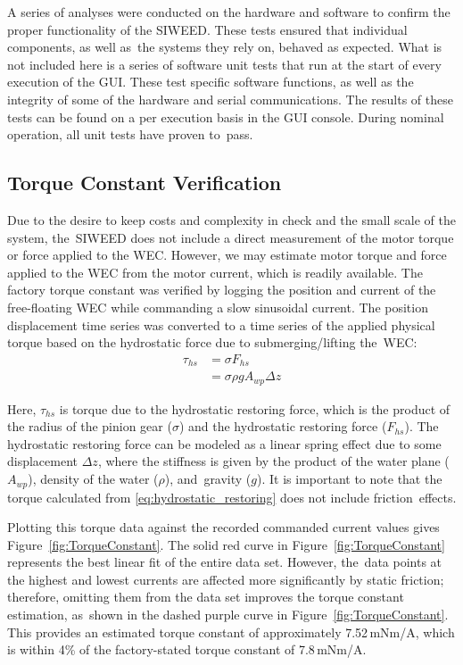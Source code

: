 \documentclass[hardware,article,submit,pdftex,moreauthors]{Definitions/mdpi}
\begin{document}
A series of analyses were conducted on the hardware and software to confirm the proper functionality of the SIWEED.
These tests ensured that individual components, as well as~the systems they rely on, behaved as expected.
What is not included here is a series of software unit tests that run at the start of every execution of the GUI.
These test specific software functions, as well as the integrity of some of the hardware and serial communications. 
The results of these tests can be found on a per execution basis in the GUI console.
During nominal operation, all unit tests have proven to~pass.

\subsection{Torque Constant Verification}\label{tConstSec}
Due to the desire to keep costs and complexity in check and the small scale of the system, the~SIWEED does not include a direct measurement of the motor torque or force applied to the WEC.
However, we may estimate motor torque and force applied to the WEC from the motor current, which is readily available.
The factory torque constant was verified by logging the position and current of the free-floating WEC while commanding a slow sinusoidal current.
The position displacement time series was converted to a time series of the applied physical torque based on the hydrostatic force due to submerging/lifting the~WEC:
%
\begin{equation}
\begin{aligned}
\tau_{hs} 
&= \sigma F_{hs} \\
&= \sigma \rho g A_{wp} \Delta z
\end{aligned}
\label{eq:hydrostatic_restoring}
\end{equation}
%

Here, $\tau_{hs}$ is torque due to the hydrostatic restoring force, which is the product of the radius of the pinion gear ($\sigma$) and the hydrostatic restoring force ($F_{hs}$).
The hydrostatic restoring force can be modeled as a linear spring effect due to some displacement $\Delta z$, where the stiffness is given by the product of the water plane ($A_{wp}$), density of the water ($\rho$), and~gravity ($g$).
It is important to note that the torque calculated from \eqref{eq:hydrostatic_restoring} does not include friction~effects.

Plotting this torque data against the recorded commanded current values gives  \mbox{Figure~\ref{fig:TorqueConstant}.}
The solid red curve in Figure~\ref{fig:TorqueConstant} represents the best linear fit of the entire data set.
However, the~data points at the highest and lowest currents are affected more significantly by static friction; therefore, omitting them from the data set improves the torque constant estimation, as~shown in the dashed purple curve in Figure~\ref{fig:TorqueConstant}.
This provides an estimated torque constant of approximately 7.52\,mNm/A, which is within 4\% of the factory-stated torque constant of 7.8\,mNm/A.
\end{document}
